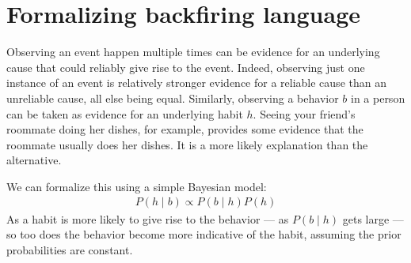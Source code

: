 \documentclass[10pt,letterpaper]{article}
\begin{document}



\section{Formalizing backfiring language}

Observing an event happen multiple times can be evidence for an underlying cause that could reliably give rise to the event.
Indeed, observing just one instance of an event is relatively stronger evidence for a reliable cause than an unreliable cause, all else being equal.
Similarly, observing a behavior $b$ in a person can be taken as evidence for an underlying habit $h$. 
Seeing your friend's roommate doing her dishes, for example, provides some evidence that the roommate usually does her dishes. 
It is a more likely explanation than the alternative.

We can formalize this using a simple Bayesian model:
\begin{eqnarray}
P(h \mid b) \propto P(b \mid h) P(h) \label{eq:bayes}
\end{eqnarray}
As a habit is more likely to give rise to the behavior --- as $P(b \mid h)$ gets large --- so too does the behavior become more indicative of the habit, assuming the prior probabilities are constant. 
\end{document}

